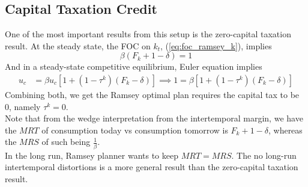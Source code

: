 \documentclass[12pt]{article}
\begin{document}
	\subsection{Capital Taxation Credit}
	One of the most important results from this setup is the zero-capital taxation result. At the steady state, the FOC on $k_t$, (\ref{eq:foc_ramsey_k}), implies
	\begin{equation*}
		\beta (F_k + 1 - \delta) = 1
	\end{equation*}
	And in a steady-state competitive equilibrium, Euler equation implies
	\begin{align*}
		u_c &= \beta u_c [1 + (1-\tau^k)(F_k - \delta)] \implies 1 = \beta [1 + (1-\tau^k)(F_k - \delta)]
	\end{align*}
	Combining both, we get the Ramsey optimal plan requires the capital tax to be 0, namely $\tau^k = 0$.\\
	
	\noindent
	Note that from the wedge interpretation from the intertemporal margin, we have the $MRT$ of consumption today vs consumption tomorrow is $F_k + 1 - \delta$, whereas the $MRS$ of such being $\frac{1}{\beta}$.\\
	In the long  run, Ramsey planner wants to keep $MRT = MRS$. The no long-run intertemporal distortions is a more general result than the zero-capital taxation result.
	
\end{document}
